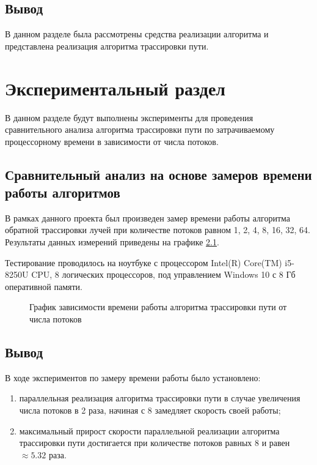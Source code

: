 \documentclass[utf8x, 12pt]{G7-32}
\begin{document}
\section{Вывод}
В данном разделе была рассмотрены средства реализации алгоритма и представлена реализация алгоритма трассировки пути.


\chapter{Экспериментальный раздел}
\label{cha:research}
    В данном разделе будут выполнены эксперименты для проведения 
    сравнительного анализа алгоритма трассировки пути по затрачиваемому процессорному 
    времени в зависимости от числа потоков.

    \section{Сравнительный анализ на основе замеров времени работы алгоритмов}
	 В рамках данного проекта был произведен замер времени работы алгоритма обратной трассировки лучей при количестве потоков равном 1, 2, 4, 8, 16, 32, 64.
	Результаты данных измерений приведены на графике \ref{graph:1}.

        Тестирование проводилось на ноутбуке с процессором
        Intel(R) Core(TM) i5-8250U CPU, 8 логических процессоров,
        под управлением Windows 10 с 8 Гб оперативной памяти.

    \begin{figure}[h!]
        \centering
        \caption{График зависимости времени работы алгоритма трассировки пути от числа потоков} 
        \label{graph:1}
    \end{figure}


\section{Вывод}
        В ходе экспериментов по замеру времени работы было установлено:
	\begin{enumerate}
	\item параллельная реализация алгоритма трассировки пути в случае увеличения числа потоков в 2 раза, начиная с 8 замедляет скорость своей работы;
	\item максимальный прирост скорости параллельной реализации алгоритма трассировки пути достигается при количестве потоков равных 8 и равен  $ \approx 5.32 $ раза.

        \end{enumerate}
\end{document}
